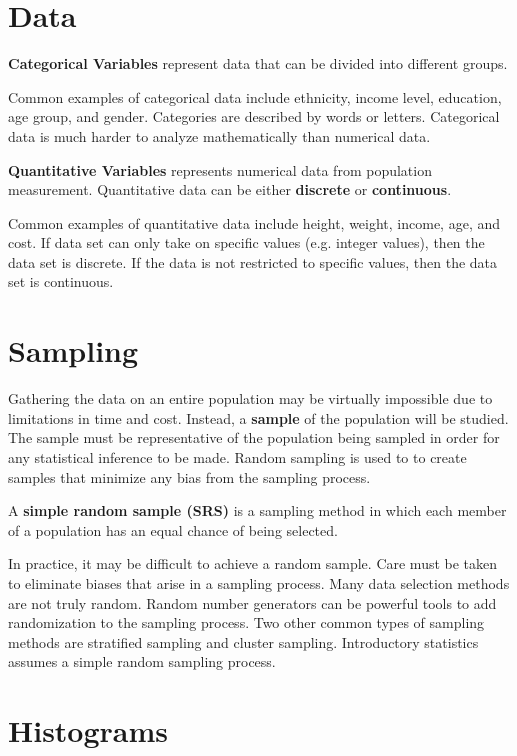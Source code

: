 \documentclass{article}
\theoremstyle{definition}
\begin{document}
\section{Data}
\begin{definition}
    \textbf{Categorical Variables} represent data that can be divided into different
    groups.
\end{definition}
\noindent Common examples of categorical data include ethnicity, income level,
education, age group, and gender. Categories are described by words or letters.
Categorical data is much harder to analyze mathematically than numerical data.
\begin{definition}
    \textbf{Quantitative Variables} represents numerical data from population
    measurement. Quantitative data can be either \textbf{discrete} or
    \textbf{continuous}.
\end{definition}
\noindent Common examples of quantitative data include height, weight, income, age, and
cost. If data set can only take on specific values (e.g. integer values), then
the data set is discrete. If the data is not restricted to specific values, then
the data set is continuous.

\section{Sampling}
Gathering the data on an entire population may be virtually impossible due to
limitations in time and cost. Instead, a \textbf{sample} of the population will
be studied. The sample must be representative of the population being sampled in
order for any statistical inference to be made. Random sampling is used to to
create samples that minimize any bias from the sampling process. 
\begin{definition}
    A \textbf{simple random sample (SRS)} is a sampling method in which each
    member of a population has an equal chance of being selected.
\end{definition}
\noindent In practice, it may be difficult to achieve a random sample. Care must be taken
to eliminate biases that arise in a sampling process. Many data selection
methods are not truly random. Random number generators can be powerful tools to
add randomization to the sampling process. Two other common types of sampling methods are 
stratified sampling and cluster sampling. Introductory statistics assumes a simple random 
sampling process.
    
\section{Histograms}
\end{document}
